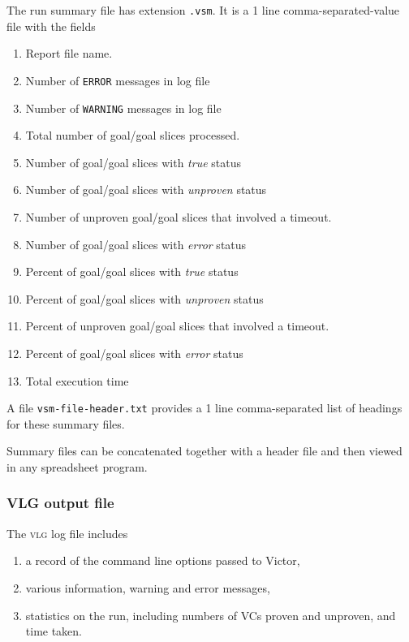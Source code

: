 \documentclass[12pt,fleqn]{article}
\newcommand{\logfile}{\textsc{vlg}}
\begin{document}
The run summary file has extension \texttt{.vsm}.  It is a 1 line
comma-separated-value file with the fields
\begin{enumerate}
\item Report file name.
\item Number of \texttt{ERROR} messages in log file
\item Number of \texttt{WARNING} messages in log file
\item Total number of goal/goal slices processed.
\item Number of goal/goal slices with \emph{true} status
\item Number of goal/goal slices with \emph{unproven} status
\item Number of unproven goal/goal slices that involved a timeout.
\item Number of goal/goal slices with \emph{error} status
\item Percent of goal/goal slices with \emph{true} status
\item Percent of goal/goal slices with \emph{unproven} status
\item Percent of unproven goal/goal slices that involved a timeout.
\item Percent of goal/goal slices with \emph{error} status
\item Total execution time
\end{enumerate}
A file \texttt{vsm-file-header.txt} provides a 1 line comma-separated list
of headings for these summary files.

Summary files can be concatenated together with a header file and then 
viewed in any spreadsheet program.

\subsubsection{VLG output file}
The \logfile{} log file includes
\begin{enumerate}
\item a record of the command line options passed to Victor,
\item various information, warning and error messages,
\item statistics on the run, including numbers of VCs proven and unproven,
  and time taken.
\end{enumerate}
\end{document}
